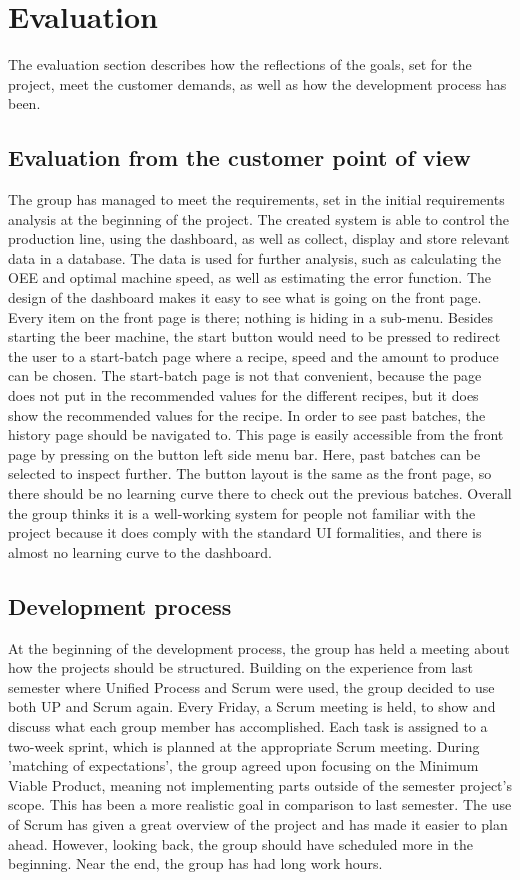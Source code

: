 \section{Evaluation}
The evaluation section describes how the reflections of the goals, set for the
project, meet the customer demands, as well as how the development process has
been.


\subsection{Evaluation from the customer point of view}
The group has managed to meet the requirements, set in the initial requirements
analysis at the beginning of the project. The created system is able to control
the production line, using the dashboard, as well as collect, display and
store relevant data in a database. The data is used for further analysis, such
as calculating the OEE and optimal machine speed, as well as estimating the
error function.
The design of the dashboard makes it easy to see what is going on the front page.
Every item on the front page is there; nothing is hiding in a sub-menu.
Besides starting the beer machine, the start button would need to be pressed
to redirect the user to a start-batch page where a recipe, speed and the amount
to produce can be chosen. The start-batch page is not that convenient, because
the page  does not put in the recommended values for the different recipes, but
it does show the recommended values for the recipe.
In order to see past batches, the history page should be navigated to. This page
is easily accessible from the front page by pressing on the button left
side menu bar. Here, past batches can be selected to inspect further. The button
layout is the same as the front page, so there should be no learning curve there
to check out the previous batches. Overall the group thinks it is a well-working
system for people not familiar with the project because it does comply with the
standard UI formalities, and there is almost no learning curve to the dashboard.


\subsection{Development process}
At the beginning of the development process, the group has held a meeting
about how the projects should be structured. Building on the experience from
last semester where Unified Process and Scrum were used, the group
decided to use both UP and Scrum again. Every Friday, a Scrum meeting is held,
to show and discuss what each group member has accomplished. Each task is
assigned to a two-week sprint, which is planned at the appropriate Scrum
meeting.
During 'matching of expectations', the group agreed upon focusing on the Minimum
Viable Product, meaning not implementing parts outside of the semester project's
scope. This has been a more realistic goal in comparison to last semester.
The use of Scrum has given a great overview of the project and has made it 
easier to plan ahead. However, looking back, the group should have scheduled 
more in the beginning. Near the end, the group has had long work hours.

